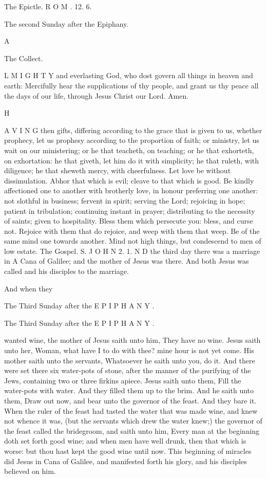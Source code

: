 The Epictle. R O M . 12. 6.

The second Sunday after the Epiphany.

A

The Collect.

L M I G H T Y and everlasting God, who dost govern all things in heaven and earth: Mercifully hear the supplications of thy people, and grant us thy peace all the days of our life, through Jesus Christ our Lord. Amen.

H

A V I N G then gifts, differing according to the grace that is given to us, whether prophecy, let us prophesy according to the proportion of faith; or ministry, let us wait on our ministering; or he that teacheth, on teaching; or he that exhorteth, on exhortation: he that giveth, let him do it with simplicity; he that ruleth, with diligence; he that sheweth mercy, with cheerfulness. Let love be without dissimulation. Abhor that which is evil; cleave to that which is good. Be kindly affectioned one to another with brotherly love, in honour preferring one another: not slothful in business; fervent in spirit; serving the Lord; rejoicing in hope; patient in tribulation; continuing instant in prayer; distributing to the necessity of saints; given to hospitality. Bless them which persecute you: bless, and curse not. Rejoice with them that do rejoice, and weep with them that weep. Be of the same mind one towards another. Mind not high things, but condescend to men of low estate. The Gospel. S. J O H N 2. 1. N D the third day there was a marriage in A Cana of Galilee; and the mother of Jesus was there. And both Jesus was called and his disciples to the marriage.

And when they

The Third Sunday after the E P I P H A N Y .

The Third Sunday after the E P I P H A N Y .

wanted wine, the mother of Jesus saith unto him, They have no wine. Jesus saith unto her, Woman, what have I to do with thee? mine hour is not yet come. His mother saith unto the servants, Whatsoever he saith unto you, do it. And there were set there six water-pots of stone, after the manner of the purifying of the Jews, containing two or three firkins apiece. Jesus saith unto them, Fill the water-pots with water. And they filled them up to the brim. And he saith unto them, Draw out now, and bear unto the governor of the feast. And they bare it. When the ruler of the feast had tasted the water that was made wine, and knew not whence it was, (but the servants which drew the water knew;) the governor of the feast called the bridegroom, and saith unto him, Every man at the beginning doth set forth good wine; and when men have well drunk, then that which is worse: but thou hast kept the good wine until now. This beginning of miracles did Jesus in Cana of Galilee, and manifested forth his glory, and his disciples believed on him.

